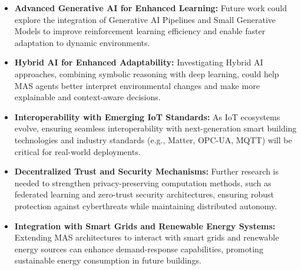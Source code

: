 \documentclass{svproc}
\begin{document}
\begin{itemize}
    \item \textbf{Advanced Generative AI for Enhanced Learning:} Future work could explore the integration of Generative AI Pipelines and Small Generative Models to improve reinforcement learning efficiency and enable faster adaptation to dynamic environments.
    
    \item \textbf{Hybrid AI for Enhanced Adaptability:} Investigating Hybrid AI approaches, combining symbolic reasoning with deep learning, could help MAS agents better interpret environmental changes and make more explainable and context-aware decisions.
    
    \item \textbf{Interoperability with Emerging IoT Standards:} As IoT ecosystems evolve, ensuring seamless interoperability with next-generation smart building technologies and industry standards (e.g., Matter, OPC-UA, MQTT) will be critical for real-world deployments.
    
    \item \textbf{Decentralized Trust and Security Mechanisms:} Further research is needed to strengthen privacy-preserving computation methods, such as federated learning and zero-trust security architectures, ensuring robust protection against cyberthreats while maintaining distributed autonomy.
    
    \item \textbf{Integration with Smart Grids and Renewable Energy Systems:} Extending MAS architectures to interact with smart grids and renewable energy sources can enhance demand-response capabilities, promoting sustainable energy consumption in future buildings.
\end{itemize}


%
%
 
 
\end{document}
